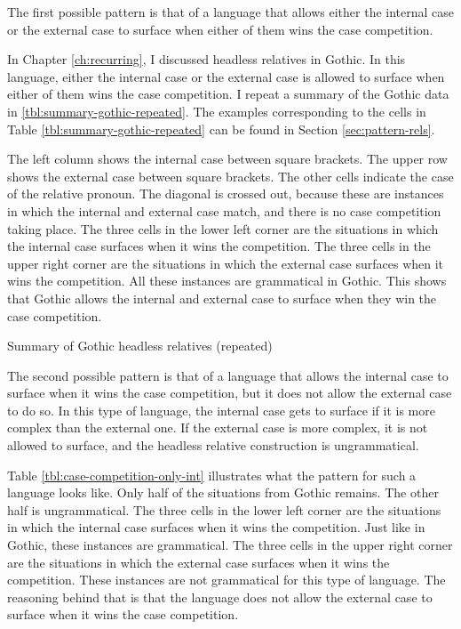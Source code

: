 The first possible pattern is that of a language that allows either the internal case or the external case to surface when either of them wins the case competition.

In Chapter \ref{ch:recurring}, I discussed headless relatives in Gothic. In this language, either the internal case or the external case is allowed to surface when either of them wins the case competition. I repeat a summary of the Gothic data in \ref{tbl:summary-gothic-repeated}. The examples corresponding to the cells in Table \ref{tbl:summary-gothic-repeated} can be found in Section \ref{sec:pattern-rels}.

The left column shows the internal case between square brackets. The upper row shows the external case between square brackets. The other cells indicate the case of the relative pronoun. The diagonal is crossed out, because these are instances in which the internal and external case match, and there is no case competition taking place.
The three cells in the lower left corner are the situations in which the internal case surfaces when it wins the competition. The three cells in the upper right corner are the situations in which the external case surfaces when it wins the competition. All these instances are grammatical in Gothic.
This shows that Gothic allows the internal and external case to surface when they win the case competition.

\begin{table}[H]
  \center
  \caption{Summary of Gothic headless relatives (repeated)}
    
    \label{tbl:summary-gothic-repeated}
\end{table}

The second possible pattern is that of a language that allows the internal case to surface when it wins the case competition, but it does not allow the external case to do so. In this type of language, the internal case gets to surface if it is more complex than the external one. If the external case is more complex, it is not allowed to surface, and the headless relative construction is ungrammatical.

Table \ref{tbl:case-competition-only-int} illustrates what the pattern for such a language looks like. Only half of the situations from Gothic remains. The other half is ungrammatical.
The three cells in the lower left corner are the situations in which the internal case surfaces when it wins the competition. Just like in Gothic, these instances are grammatical.
The three cells in the upper right corner are the situations in which the external case surfaces when it wins the competition. These instances are not grammatical for this type of language. The reasoning behind that is that the language does not allow the external case to surface when it wins the case competition.

